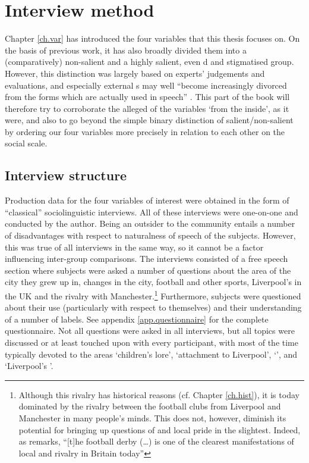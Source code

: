 \chapter{Interview method}\label{ch.prod_method}

Chapter \ref{ch.var} has introduced the four variables that this thesis focuses on.
On the basis of previous work, it has also broadly divided them into a (comparatively) non-salient and a highly salient, even d and stigmatised group.
However, this distinction was largely based on experts' judgements and evaluations, and especially external s may well ``become increasingly divorced from the forms which are actually used in speech'' \parencite[180]{labov1972}.
This part of the book will therefore try to corroborate the alleged  of the variables `from the inside', as it were, and also to go beyond the simple binary distinction of salient/non-salient by ordering our four variables more precisely in relation to each other on the social  scale.

	\section{Interview structure}\label{sec.prod_method.interview}
	
Production data for the four variables of interest were obtained in the form of ``classical'' sociolinguistic interviews.
All of these interviews were one-on-one and conducted by the author.
Being an outsider to the community entails a number of disadvantages with respect to naturalness of speech of the subjects.
However, this was true of all interviews in the same way, so it cannot be a factor influencing inter-group comparisons.
The interviews consisted of a free speech section where subjects were asked a number of questions about the area of the city they grew up in, changes in the city, football and other sports, Liverpool's  in the UK and the rivalry with Manchester.\footnote{Although this rivalry has historical reasons (cf. Chapter \ref{ch.hist}), it is today dominated by the rivalry between the football clubs from Liverpool and Manchester in many people's minds. This does not, however, diminish its potential for bringing up questions of  and local pride in the slightest. Indeed, as \textcite[97]{beal2010} remarks, ``[t]he football derby (\dots) is one of the clearest manifestations of local  and rivalry in Britain today''}
Furthermore, subjects were questioned about their use (particularly with respect to themselves) and their understanding of a number of  labels.
See appendix \ref{app.questionnaire} for the complete questionnaire.
Not all questions were asked in all interviews, but all topics were discussed or at least touched upon with every participant, with most of the time typically devoted to the areas `children's lore', `attachment to Liverpool', `', and `Liverpool's '.

